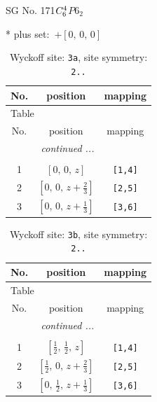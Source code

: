 \documentclass[fleqn,8pt]{jsarticle}
\begin{document}
\setcounter{MaxMatrixCols}{32}

\renewcommand{\tablename}{Table~}
\renewcommand{\figurename}{Figure~}
\begin{center}
\LARGE
SG No. 171\quad$C_{\rm 6}^{4}$\quad$P6_2$\quad[ hexagonal ]
\end{center}
* plus set:\,\,\,$+\left[ 0,\, 0,\, 0 \right]$
\renewcommand{\arraystretch}{1.2}
\begin{longtable}{ccc}
\caption{Wyckoff site: {\tt 3a}, site symmetry: {\tt 2..}}
 \\
 \hline \hline
No. & position & mapping \\ \hline \endfirsthead

\multicolumn{2}{l}{\tablename\ \thetable{}} \\
 \hline \hline
No. & position & mapping \\ \hline \endhead

 \hline \hline
\multicolumn{2}{r}{\footnotesize\it continued ...} \\ \endfoot

 \hline \hline
\multicolumn{2}{r}{} \\ \endlastfoot

1 & $\left[ 0,\, 0,\, z \right]$ & {\tt [1,4]} \\ \hline
2 & $\left[ 0,\, 0,\, z + \frac{2}{3} \right]$ & {\tt [2,5]} \\ \hline
3 & $\left[ 0,\, 0,\, z + \frac{1}{3} \right]$ & {\tt [3,6]} \\
\end{longtable}
\renewcommand{\arraystretch}{1.2}
\begin{longtable}{ccc}
\caption{Wyckoff site: {\tt 3b}, site symmetry: {\tt 2..}}
 \\
 \hline \hline
No. & position & mapping \\ \hline \endfirsthead

\multicolumn{2}{l}{\tablename\ \thetable{}} \\
 \hline \hline
No. & position & mapping \\ \hline \endhead

 \hline \hline
\multicolumn{2}{r}{\footnotesize\it continued ...} \\ \endfoot

 \hline \hline
\multicolumn{2}{r}{} \\ \endlastfoot

1 & $\left[ \frac{1}{2},\, \frac{1}{2},\, z \right]$ & {\tt [1,4]} \\ \hline
2 & $\left[ \frac{1}{2},\, 0,\, z + \frac{2}{3} \right]$ & {\tt [2,5]} \\ \hline
3 & $\left[ 0,\, \frac{1}{2},\, z + \frac{1}{3} \right]$ & {\tt [3,6]} \\
\end{longtable}
\end{document}
